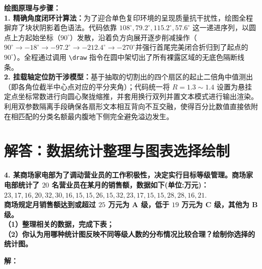 \vspace{0.6cm}

{\small\color{blue!70!black}
\textbf{绘图原理与步骤：}\\
\textbf{1. 精确角度闭环计算法：}为了迎合单色复印环境的呈现质量抗干扰性，绘图全程摒弃了块状阴影着色语法。代码依靠 $108^\circ, 79.2^\circ, 115.2^\circ, 57.6^\circ$ 这一递进序列，以圆点上方起始坐标（$90^\circ$）发散，沿着负方向展开逐步削减操作（$90^\circ \to -18^\circ \to -97.2^\circ \to -212.4^\circ \to -270^\circ$并强行首尾完美闭合折归到了起点的 $90^\circ$）。全程通过调用 \texttt{\textbackslash draw} 指令在圆中架切出了所有裸露区域的无底色隔断线条。\\
\textbf{2. 挂载轴定位防干涉模型：}基于抽取的切割出的四个扇区的起止二倍角中值测出（即各角位截半中心点对应的平分夹角）；代码统一将 $R=1.3 \sim 1.4$ 设置为悬挂定点坐标常数进行向圆心聚拢缩推，并套用换行双列并置文本模式进行输出渲染。利用双参数隔离手段确保各扇形文本相互背向不互交融，使得百分比数值直接依附在相匹配的分类名额最内腹地下侧完全避免溢边发生。
}

\newpage



\newpage

\section{解答：数据统计整理与图表选择绘制}

\vspace{0.6cm}

\textbf{4. 某商场家电部为了调动营业员的工作积极性，决定实行目标等级管理。商场家电部统计了 $20$ 名营业员在某月的销售额，数据如下(单位:万元)：}\\
$23,17,16,20,32,30,16,15,15,26,15,32,23,17,15,15,28,28,16,21.$\\
\textbf{商场规定月销售额达到或超过 $25$ 万元为 A 级，低于 $19$ 万元为 C 级，其他为 B 级。}\\
\textbf{（1）整理相关的数据，完成下表；}\\
\textbf{（2）你认为用哪种统计图反映不同等级人数的分布情况比较合理？绘制你选择的统计图。}

\vspace{0.4cm}

\textbf{解：}

